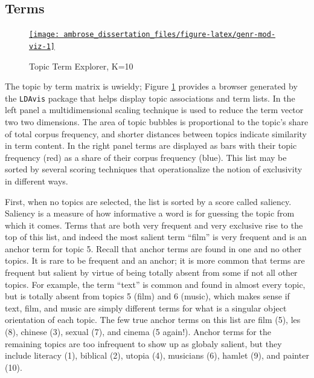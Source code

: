 \documentclass[]{book}
\theoremstyle{definition}
\theoremstyle{definition}
\theoremstyle{definition}
\theoremstyle{remark}
\begin{document}
\hypertarget{terms}{%
\subsection{Terms}\label{terms}}

\begin{figure}

{\centering \href{https://mercury.dlab.berkeley.edu:2018}{\texttt{[image: ambrose\_dissertation\_files/figure-latex/genr-mod-viz-1]} }

}

\caption{Topic Term Explorer, K=10}\label{fig:genr-mod-viz}
\end{figure}

The topic by term matrix is uwieldy; Figure \ref{fig:genr-mod-viz}
provides a browser generated by the \texttt{LDAvis} package that helps
display topic associations and term lists. In the left panel a
multidimensional scaling technique is used to reduce the term vector two
two dimensions. The area of topic bubbles is proportional to the topic's
share of total corpus frequency, and shorter distances between topics
indicate similarity in term content. In the right panel terms are
displayed as bars with their topic frequency (red) as a share of their
corpus frequency (blue). This list may be sorted by several scoring
techniques that operationalize the notion of exclusivity in different
ways.

First, when no topics are selected, the list is sorted by a score called
saliency. Saliency is a measure of how informative a word is for
guessing the topic from which it comes. Terms that are both very
frequent and very exclusive rise to the top of this list, and indeed the
most salient term ``film'' is very frequent and is an anchor term for
topic 5. Recall that anchor terms are found in one and no other topics.
It is rare to be frequent and an anchor; it is more common that terms
are frequent but salient by virtue of being totally absent from some if
not all other topics. For example, the term ``text'' is common and found
in almost every topic, but is totally absent from topics 5 (film) and 6
(music), which makes sense if text, film, and music are simply different
terms for what is a singular object orientation of each topic. The few
true anchor terms on this list are film (5), les (8), chinese (3),
sexual (7), and cinema (5 again!). Anchor terms for the remaining topics
are too infrequent to show up as globaly salient, but they include
literacy (1), biblical (2), utopia (4), musicians (6), hamlet (9), and
painter (10).
\end{document}
